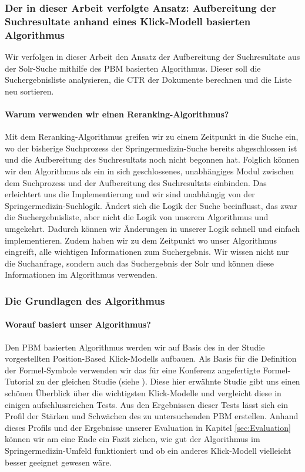 \subsubsection{Der in dieser Arbeit verfolgte Ansatz: Aufbereitung der Suchresultate anhand eines Klick-Modell basierten Algorithmus}
\label{sec:Grundlagen:Grundbegriffe:Result-RerankingPBM:AnsatzSucheEinbinden}

Wir verfolgen in dieser Arbeit den Ansatz der Aufbereitung der Suchresultate aus der Solr-Suche mithilfe des PBM basierten Algorithmus. Dieser soll die Suchergebnisliste analysieren, die CTR der Dokumente berechnen und die Liste neu sortieren. 

\paragraph{Warum verwenden wir einen Reranking-Algorithmus?}
Mit dem Reranking-Algorithmus greifen wir zu einem Zeitpunkt in die Suche ein, wo der bisherige Suchprozess der Springermedizin-Suche bereits abgeschlossen ist und die Aufbereitung des Suchresultats noch nicht begonnen hat. Folglich können wir den Algorithmus als ein in sich geschlossenes, unabhängiges Modul zwischen dem Suchprozess und der Aufbereitung des Suchresultats einbinden. Das erleichtert uns die Implementierung und wir sind unabhängig von der Springermedizin-Suchlogik. Ändert sich die Logik der Suche beeinflusst, das zwar die Suchergebnisliste, aber nicht die Logik von unserem Algorithmus und umgekehrt. Dadurch können wir Änderungen in unserer Logik schnell und einfach implementieren. Zudem haben wir zu dem Zeitpunkt wo unser Algorithmus eingreift, alle wichtigen Informationen zum Suchergebnis. Wir wissen nicht nur die Suchanfrage, sondern auch das Suchergebnis der Solr und können diese Informationen im Algorithmus verwenden.

\subsubsection{Die Grundlagen des Algorithmus}
\label{sec:Grundlagen:Grundbegriffe:Result-RerankingPBM:Grundlagen}

\paragraph{Worauf basiert unser Algorithmus?}
Den PBM basierten Algorithmus werden wir auf Basis des in der Studie \cite{pbm} vorgestellten Position-Based Klick-Modells aufbauen. Als Basis für die Definition der Formel-Symbole verwenden wir das für eine Konferenz angefertigte Formel-Tutorial zu der gleichen Studie (siehe \cite{pbmTutorial}). Diese hier erwähnte Studie gibt uns einen schönen Überblick über die wichtigsten Klick-Modelle und vergleicht diese in einigen aufschlussreichen Tests. Aus den Ergebnissen dieser Tests lässt sich ein Profil der Stärken und Schwächen des zu untersuchenden PBM erstellen. Anhand dieses Profils und der Ergebnisse unserer Evaluation in Kapitel \ref{sec:Evaluation} können wir am eine Ende ein Fazit ziehen, wie gut der Algorithmus im Springermedizin-Umfeld funktioniert und ob ein anderes Klick-Modell vielleicht besser geeignet gewesen wäre.

